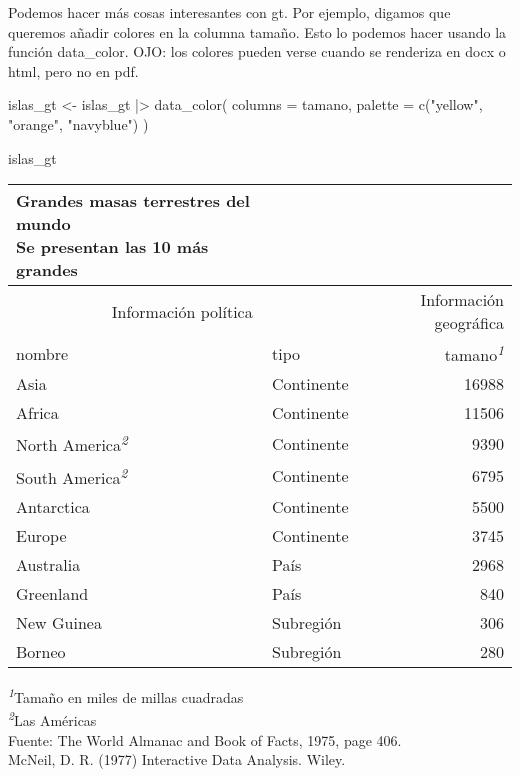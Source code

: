 \documentclass[
]{article}
\newenvironment{Shaded}{\begin{snugshade}}{\end{snugshade}}
\newcommand{\AttributeTok}[1]{\textcolor[rgb]{0.77,0.63,0.00}{#1}}
\newcommand{\FunctionTok}[1]{\textcolor[rgb]{0.00,0.00,0.00}{#1}}
\newcommand{\NormalTok}[1]{#1}
\newcommand{\OtherTok}[1]{\textcolor[rgb]{0.56,0.35,0.01}{#1}}
\newcommand{\SpecialCharTok}[1]{\textcolor[rgb]{0.00,0.00,0.00}{#1}}
\newcommand{\StringTok}[1]{\textcolor[rgb]{0.31,0.60,0.02}{#1}}
\begin{document}
Podemos hacer más cosas interesantes con gt. Por ejemplo, digamos que
queremos añadir colores en la columna tamaño. Esto lo podemos hacer
usando la función data\_color. OJO: los colores pueden verse cuando se
renderiza en docx o html, pero no en pdf.

\begin{Shaded}
\begin{Highlighting}[]
\NormalTok{islas\_gt }\OtherTok{\textless{}{-}}\NormalTok{ islas\_gt }\SpecialCharTok{|\textgreater{}} 
  \FunctionTok{data\_color}\NormalTok{(}
    \AttributeTok{columns =}\NormalTok{ tamano,}
    \AttributeTok{palette =} \FunctionTok{c}\NormalTok{(}\StringTok{"yellow"}\NormalTok{, }\StringTok{"orange"}\NormalTok{, }\StringTok{"navyblue"}\NormalTok{)}
\NormalTok{  )}

\NormalTok{islas\_gt}
\end{Highlighting}
\end{Shaded}

\setlength{\LTpost}{0mm}
\begin{longtable}{llr}
\caption*{
{\large Grandes masas terrestres del mundo} \\ 
{\small Se presentan las 10 más grandes}
} \\ 
\toprule
\multicolumn{2}{c}{Información política} & Información geográfica \\ 
\cmidrule(lr){1-2} \cmidrule(lr){3-3}
nombre & tipo & tamano\textsuperscript{\textit{1}} \\ 
\midrule
Asia & Continente & 16988 \\ 
Africa & Continente & 11506 \\ 
North America\textsuperscript{\textit{2}} & Continente & 9390 \\ 
South America\textsuperscript{\textit{2}} & Continente & 6795 \\ 
Antarctica & Continente & 5500 \\ 
Europe & Continente & 3745 \\ 
Australia & País & 2968 \\ 
Greenland & País & 840 \\ 
New Guinea & Subregión & 306 \\ 
Borneo & Subregión & 280 \\ 
\bottomrule
\end{longtable}
\begin{minipage}{\linewidth}
\textsuperscript{\textit{1}}Tamaño en miles de millas cuadradas\\
\textsuperscript{\textit{2}}Las Américas\\
Fuente: The World Almanac and Book of Facts, 1975, page 406.\\
McNeil, D. R. (1977) Interactive Data Analysis. Wiley.\\
\end{minipage}
\end{document}
